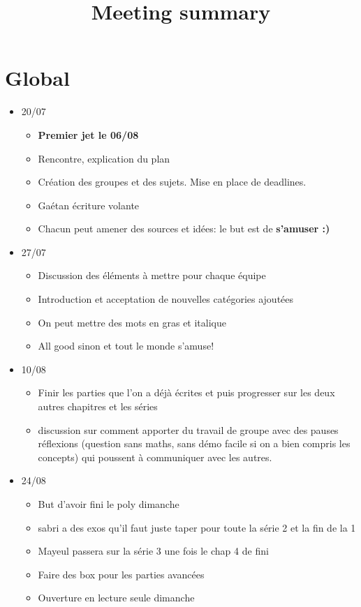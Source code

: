\documentclass[a4paper, 12pt, french, twoside]{article}
\title{Meeting summary}
\begin{document}
\maketitle  
\section{Global}
\begin{itemize}
    \item 20/07 \begin{itemize}
        \item \textbf{Premier jet le 06/08}
        \item Rencontre, explication du plan
        \item Création des groupes et des sujets. Mise en place de deadlines.
        \item Gaétan écriture volante
        \item Chacun peut amener des sources et idées: le but est de \textbf{s'amuser :)} 
    \end{itemize}
    \item 27/07
        \begin{itemize}
            \item Discussion des éléments à mettre pour chaque équipe
            \item Introduction et acceptation de nouvelles catégories ajoutées
            \item On peut mettre des mots en gras et italique
            \item All good sinon et tout le monde s'amuse!
        \end{itemize}
    \item 10/08
        \begin{itemize}
            \item Finir les parties que l'on a déjà écrites et puis progresser sur les deux autres chapitres et les séries
            \item discussion sur comment apporter du travail de groupe avec des pauses réflexions (question sans maths, sans démo facile si on a bien compris les concepts) qui poussent à communiquer avec les autres.
            
        \end{itemize}
   \item 24/08
    \begin{itemize}
        \item But d'avoir fini le poly dimanche
        \item sabri a des exos qu'il faut juste taper pour toute la série 2 et la fin de la 1 
        \item Mayeul passera sur la série 3 une fois le chap 4 de fini
        \item Faire des box pour les parties avancées
        \item Ouverture en lecture seule dimanche
    \end{itemize}
\end{itemize}
\end{document}
